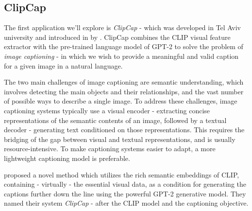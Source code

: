 \documentclass{article}
\begin{document}

\subsection{ClipCap}
\label{sec:clipcap}

The first application we'll explore is \emph{ClipCap} - which was developed in Tel Aviv university and introduced in \citeyear{mokady2021clipcap} by \citet{mokady2021clipcap}. ClipCap combines the CLIP visual feature extractor with the pre-trained language model of GPT-2 to solve the problem of \emph{image captioning} - in which we wish to provide a meaningful and valid caption for a given image in a natural language.

\medskip
\noindent
The two main challenges of image captioning are semantic understanding, which involves detecting the main objects and their relationships, and the vast number of possible ways to describe a single image. To address these challenges, image captioning systems typically use a visual encoder - extracting concise representations of the semantic contents of an image, followed by a textual decoder - generating text conditioned on those representations. This requires the bridging of the gap between visual and textual representations, and is usually resource-intensive. To make captioning systems easier to adapt, a more lightweight captioning model is preferable.

\medskip
\noindent
\citet{mokady2021clipcap} proposed a novel method which utilizes the rich semantic embeddings of CLIP,
containing - virtually - the essential visual data, as a condition for generating the captions further down the line using the powerful GPT-2 generative model. They named their system \emph{ClipCap} - after the CLIP model and the captioning objective.
\end{document}
